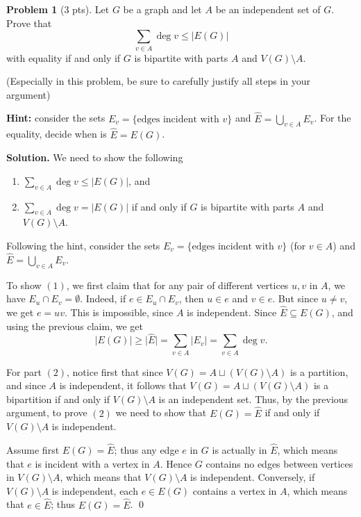 \documentclass[11pt]{scrartcl}
\theoremstyle{definition}
\newtheorem{problem}{Problem}
\newenvironment{solution}{\noindent\textbf{Solution.}}{\qed}
\newcommand*{\abs}[1]{\lvert #1\rvert}     %
\begin{document}
\begin{problem}[3 pts]
	Let $G$ be a graph and let $A$ be an independent set of $G$.
	Prove that
	\[
	\sum_{v\in A}\deg v \leq\abs{E(G)}
	\]
	with equality if and only if $G$ is bipartite with parts $A$ and $V(G)\setminus A$.
	
	\noindent (Especially in this problem, be sure to carefully justify all steps in your argument)
	
	\noindent \textbf{Hint:} consider the sets $E_v=\{\text{edges incident with } v\}$ and $\widehat{E}=\bigcup_{v \in A} E_v$. For the equality, decide when is $\widehat{E}=E(G)$.
\end{problem}
\begin{solution}
We need to show the following
\begin{enumerate}[label=(\arabic*)]
	\item $\displaystyle \sum_{v\in A}\deg v \leq\abs{E(G)}$, and
	\item $\displaystyle \sum_{v\in A}\deg v = \abs{E(G)}$ if and only if $G$ is bipartite with parts $A$ and $V(G)\setminus A$.
\end{enumerate}

Following the hint, consider the sets $E_v=\{\text{edges incident with } v\}$ (for $v\in A$) and $\widehat{E}=\bigcup_{v \in A} E_v$.

\medbreak
To show $(1)$, we first claim that for any pair of different vertices $u, v$  in $A$, we have $E_u\cap E_v=\emptyset$. Indeed, if $e\in E_u\cap E_v$, then $u\in e$ and $v\in e$. But since $u\ne v$, we get $e=uv$. This is impossible, since $A$ is independent. 
Since $\widehat{E}\subseteq E(G)$, and using the previous claim, we get 
\[ \abs{E(G)} \geq \abs{\widehat E}= \displaystyle  \sum_{v\in A}\abs{E_v}= \sum_{v\in A}\deg v.\]

For part $(2)$, notice first that since $V(G)=A \sqcup (V(G)\setminus A)$ is a partition, and since $A$ is independent, it follows that $V(G)=A \sqcup (V(G)\setminus A)$ is a bipartition if and only if $V(G)\setminus A$ is an independent set.
Thus, by the previous argument, to prove $(2)$ we need to show that $E(G)=\widehat E$ if and only if $V(G)\setminus A$ is independent. 

Assume first $E(G)=\widehat E$; thus any edge $e$ in $G$ is actually in $\widehat E$, which means that $e$ is incident with a vertex in $A$. Hence $G$ contains no edges between vertices in $V(G)\setminus A$, which means that $V(G)\setminus A$ is independent. Conversely, if $V(G)\setminus A$ is independent, each $e\in E(G)$ contains a vertex in $A$, which means that $e\in \widehat E$; thus $E(G)= \widehat E$.
\end{solution}
\end{document}
